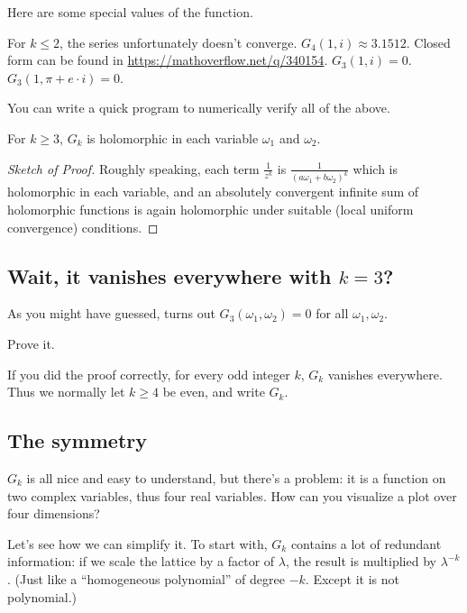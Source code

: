 \begin{example}
	Here are some special values of the function.
	\begin{itemize}
		\ii For $k \leq 2$, the series unfortunately doesn't converge.
		\ii $G_4(1, i) \approx 3.1512$.
		Closed form can be found in \url{https://mathoverflow.net/q/340154}.
		\ii $G_3(1, i) = 0$.
		\ii $G_3(1, \pi+e \cdot i) = 0$.
	\end{itemize}
\end{example}

You can write a quick program to numerically verify all of the above.

\begin{claim}
	For $k \geq 3$, $G_k$ is holomorphic in each variable $\omega_1$ and $\omega_2$.
\end{claim}
\begin{proof}[Sketch of Proof]
	Roughly speaking, each term $\frac{1}{z^k}$ is $\frac{1}{(a \omega_1+b \omega_2)^k}$
	which is holomorphic in each variable,
	and an absolutely convergent infinite sum of holomorphic functions
	is again holomorphic under suitable (local uniform convergence) conditions.
\end{proof}

\subsection{Wait, it vanishes everywhere with $k=3$?}

As you might have guessed, turns out $G_3(\omega_1, \omega_2) = 0$ for all $\omega_1, \omega_2$.
\begin{exercise}
	Prove it.
\end{exercise}

If you did the proof correctly, for every odd integer $k$, $G_k$ vanishes everywhere.
Thus we normally let $k \geq 4$ be even, and write $G_k$.

\subsection{The symmetry}

$G_k$ is all nice and easy to understand, but there's a problem: it is a function on two complex
variables, thus four real variables. How can you visualize a plot over four dimensions?

Let's see how we can simplify it. To start with, $G_k$ contains a lot of redundant information:
if we scale the lattice by a factor of $\lambda$, the result is multiplied by $\lambda^{-k}$.
(Just like a ``homogeneous polynomial'' of degree $-k$. Except it is not polynomial.)


